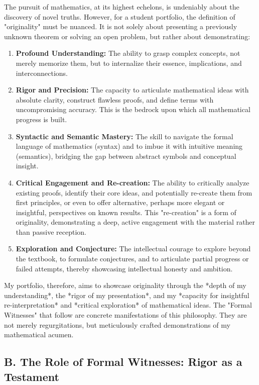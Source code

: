 \documentclass[11pt, a4paper]{article}
\theoremstyle{plain} %
\theoremstyle{definition} %
\theoremstyle{remark} %
\begin{document}
The pursuit of mathematics, at its highest echelons, is undeniably about the discovery of novel truths. However, for a student portfolio, the definition of "originality" must be nuanced. It is not solely about presenting a previously unknown theorem or solving an open problem, but rather about demonstrating:

\begin{enumerate}
    \item \textbf{Profound Understanding:} The ability to grasp complex concepts, not merely memorize them, but to internalize their essence, implications, and interconnections.
    \item \textbf{Rigor and Precision:} The capacity to articulate mathematical ideas with absolute clarity, construct flawless proofs, and define terms with uncompromising accuracy. This is the bedrock upon which all mathematical progress is built.
    \item \textbf{Syntactic and Semantic Mastery:} The skill to navigate the formal language of mathematics (syntax) and to imbue it with intuitive meaning (semantics), bridging the gap between abstract symbols and conceptual insight.
    \item \textbf{Critical Engagement and Re-creation:} The ability to critically analyze existing proofs, identify their core ideas, and potentially re-create them from first principles, or even to offer alternative, perhaps more elegant or insightful, perspectives on known results. This "re-creation" is a form of originality, demonstrating a deep, active engagement with the material rather than passive reception.
    \item \textbf{Exploration and Conjecture:} The intellectual courage to explore beyond the textbook, to formulate conjectures, and to articulate partial progress or failed attempts, thereby showcasing intellectual honesty and ambition.
\end{enumerate}

My portfolio, therefore, aims to showcase originality through the *depth of my understanding*, the *rigor of my presentation*, and my *capacity for insightful re-interpretation* and *critical exploration* of mathematical ideas. The "Formal Witnesses" that follow are concrete manifestations of this philosophy. They are not merely regurgitations, but meticulously crafted demonstrations of my mathematical acumen.

\subsection{B. The Role of Formal Witnesses: Rigor as a Testament}
\end{document}
